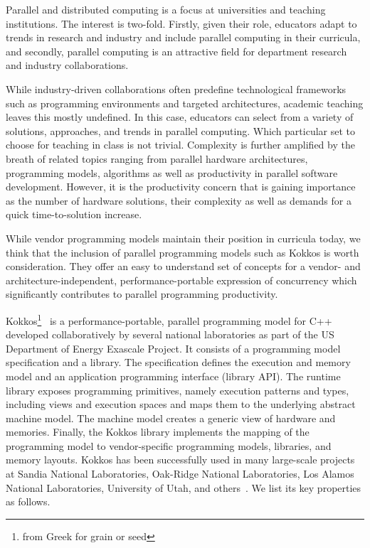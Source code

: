 
Parallel and distributed computing is a focus at universities and teaching institutions. The interest is two-fold. Firstly, given their role, educators adapt to trends in research and industry and include parallel computing in their curricula, and secondly, parallel computing is an attractive field for department research and industry collaborations. 

While industry-driven collaborations often predefine technological frameworks such as programming environments and targeted architectures, academic teaching leaves this mostly undefined. In this case, educators can select from a variety of solutions, approaches, and trends in parallel computing. Which particular set to choose for teaching in class is not trivial. Complexity is further amplified by the breath of related topics ranging from parallel hardware architectures, programming models, algorithms as well as productivity in parallel software development. However, it is the productivity concern that is gaining importance as the number of hardware solutions, their complexity as well as demands for a quick time-to-solution increase.

While vendor programming models maintain their position in curricula today, we think that the inclusion of parallel programming models such as Kokkos is worth consideration. They offer an easy to understand set of concepts for a vendor- and architecture-independent, performance-portable expression of concurrency which significantly contributes to parallel programming productivity. 

Kokkos\footnote{from Greek for grain or seed}~\cite{KOKKOS} is a performance-portable, parallel programming model for C++ developed collaboratively by several national laboratories as part of the US Department of Energy Exascale Project\cite{ECP}. It consists of a programming model specification and a library. The specification defines the execution and memory model and an application programming interface (library API). The runtime library exposes programming primitives, namely execution patterns and types, including views and execution spaces and maps them to the underlying abstract machine model. The machine model creates a generic view of hardware and memories. Finally, the Kokkos library implements the mapping of the programming model to vendor-specific programming models, libraries, and memory layouts. Kokkos has been successfully used in many large-scale projects at Sandia National Laboratories, Oak-Ridge National Laboratories, Los Alamos National Laboratories, University of Utah, and others~\cite{KOKKOSPROJS}. We list its key properties as follows.

